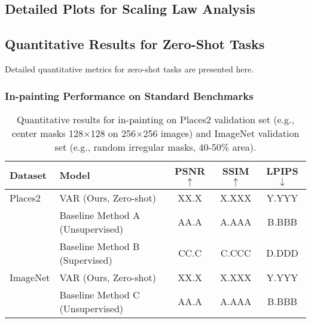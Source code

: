 \documentclass{article}
\begin{document}
\subsection{Detailed Plots for Scaling Law Analysis}


\subsection{Quantitative Results for Zero-Shot Tasks}
Detailed quantitative metrics for zero-shot tasks are presented here.
\subsubsection{In-painting Performance on Standard Benchmarks}
\begin{table}[h!]
\centering
\caption{Quantitative results for in-painting on Places2 \cite{zhou2017places} validation set (e.g., center masks 128$\times$128 on 256$\times$256 images) and ImageNet validation set (e.g., random irregular masks, 40-50\% area).}
\label{app_tab:inpainting_results}
\begin{tabular}{llccc}
\toprule
Dataset & Model & PSNR $\uparrow$ & SSIM $\uparrow$ & LPIPS \cite{zhang2018unreasonable} $\downarrow$ \\ %
\midrule
Places2 & VAR (Ours, Zero-shot) & XX.X & X.XXX & Y.YYY \\
& Baseline Method A (Unsupervised) & AA.A & A.AAA & B.BBB \\
& Baseline Method B (Supervised) & CC.C & C.CCC & D.DDD \\
\midrule
ImageNet & VAR (Ours, Zero-shot) & XX.X & X.XXX & Y.YYY \\
& Baseline Method C (Unsupervised) & AA.A & A.AAA & B.BBB \\
\bottomrule
\end{tabular}
\end{table}
\end{document}
